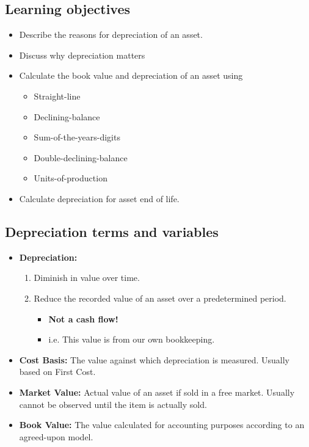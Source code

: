 \subsection{Learning objectives}
\begin{summary}
    \begin{itemize}
        \item Describe the reasons for depreciation of an asset.
        \item Discuss why depreciation matters
        \item Calculate the book value and depreciation of an asset using 
        \begin{itemize}
            \item Straight-line
            \item Declining-balance
            \item Sum-of-the-years-digits
            \item Double-declining-balance
            \item Units-of-production
        \end{itemize}
        \item Calculate depreciation for asset end of life. 
    \end{itemize}
\end{summary}

\subsection{Depreciation terms and variables}
\begin{terminology}
    \begin{itemize}
        \item \textbf{Depreciation:}
            \begin{enumerate}
                \item Diminish in value over time.
                \item Reduce the recorded value of an asset over a predetermined period.
                    \begin{itemize}
                        \item \textbf{Not a cash flow!}
                        \item i.e. This value is from our own bookkeeping.
                    \end{itemize}
            \end{enumerate}

        
        \item \textbf{Cost Basis:} The value against which depreciation is measured. Usually based on First Cost.
        
        \item \textbf{Market Value:} Actual value of an asset if sold in a free market. Usually cannot be observed until the item is actually sold.
        
        \item \textbf{Book Value:} The value calculated for accounting purposes according to an agreed-upon model.    
    \end{itemize}
\end{terminology}

